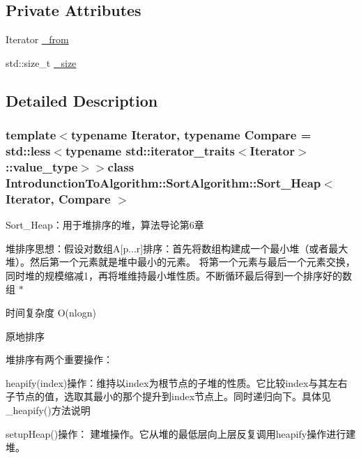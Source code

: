 \subsection*{Private Attributes}
\begin{DoxyCompactItemize}
\item 
Iterator \hyperlink{class_introdunction_to_algorithm_1_1_sort_algorithm_1_1_sort___heap_a7f6c20382257308edd2c0049ec46ad66}{\+\_\+from}
\item 
std\+::size\+\_\+t \hyperlink{class_introdunction_to_algorithm_1_1_sort_algorithm_1_1_sort___heap_a3cbf6e8a1972cc62bce0b50226024a52}{\+\_\+size}
\end{DoxyCompactItemize}


\subsection{Detailed Description}
\subsubsection*{template$<$typename Iterator, typename Compare = std\+::less$<$typename std\+::iterator\+\_\+traits$<$\+Iterator$>$\+::value\+\_\+type$>$$>$class Introdunction\+To\+Algorithm\+::\+Sort\+Algorithm\+::\+Sort\+\_\+\+Heap$<$ Iterator, Compare $>$}

Sort\+\_\+\+Heap：用于堆排序的堆，算法导论第6章 


\begin{DoxyItemize}
\item 堆排序思想：假设对数组\+A\mbox{[}p...r\mbox{]}排序：首先将数组构建成一个最小堆（或者最大堆）。然后第一个元素就是堆中最小的元素。 将第一个元素与最后一个元素交换，同时堆的规模缩减1，再将堆维持最小堆性质。不断循环最后得到一个排序好的数组 $\ast$
\item 时间复杂度 O(nlogn)
\item 原地排序
\end{DoxyItemize}

堆排序有两个重要操作：


\begin{DoxyItemize}
\item heapify(index)操作：维持以index为根节点的子堆的性质。它比较index与其左右子节点的值，选取其最小的那个提升到index节点上。同时递归向下。具体见\+\_\+heapify()方法说明
\item setup\+Heap()操作： 建堆操作。它从堆的最低层向上层反复调用heapify操作进行建堆。 
\end{DoxyItemize}

